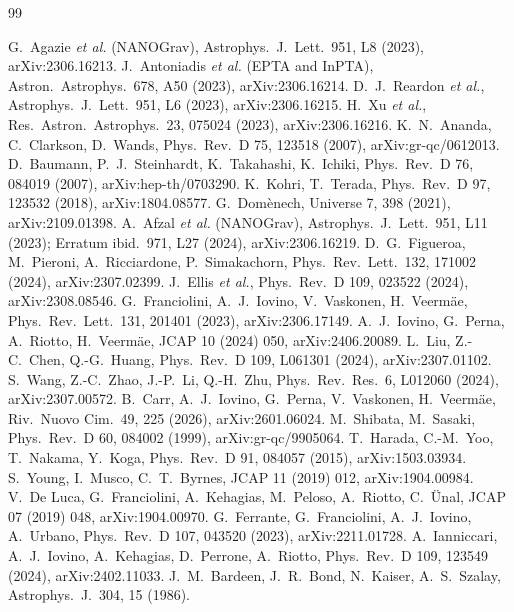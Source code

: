 \documentclass[11pt,a4paper]{article}
\begin{document}
\begin{thebibliography}{99}\raggedright
{} G.~Agazie {\it et al.} (NANOGrav), Astrophys.\ J.\ Lett.\ 951, L8 (2023), arXiv:2306.16213.
 J.~Antoniadis {\it et al.} (EPTA and InPTA), Astron.\ Astrophys.\ 678, A50 (2023), arXiv:2306.16214.
 D.~J.~Reardon {\it et al.}, Astrophys.\ J.\ Lett.\ 951, L6 (2023), arXiv:2306.16215.
 H.~Xu {\it et al.}, Res.\ Astron.\ Astrophys.\ 23, 075024 (2023), arXiv:2306.16216.
 K.~N.~Ananda, C.~Clarkson, D.~Wands, Phys.\ Rev.\ D 75, 123518 (2007), arXiv:gr-qc/0612013.
 D.~Baumann, P.~J.~Steinhardt, K.~Takahashi, K.~Ichiki, Phys.\ Rev.\ D 76, 084019 (2007), arXiv:hep-th/0703290.
 K.~Kohri, T.~Terada, Phys.\ Rev.\ D 97, 123532 (2018), arXiv:1804.08577.
 G.~Dom\`enech, Universe 7, 398 (2021), arXiv:2109.01398.
 A.~Afzal {\it et al.} (NANOGrav), Astrophys.\ J.\ Lett.\ 951, L11 (2023); Erratum ibid.\ 971, L27 (2024), arXiv:2306.16219.
 D.~G.~Figueroa, M.~Pieroni, A.~Ricciardone, P.~Simakachorn, Phys.\ Rev.\ Lett.\ 132, 171002 (2024), arXiv:2307.02399.
 J.~Ellis {\it et al.}, Phys.\ Rev.\ D 109, 023522 (2024), arXiv:2308.08546.
 G.~Franciolini, A.~J.~Iovino, V.~Vaskonen, H.~Veerm\"ae, Phys.\ Rev.\ Lett.\ 131, 201401 (2023), arXiv:2306.17149.
 A.~J.~Iovino, G.~Perna, A.~Riotto, H.~Veerm\"ae, JCAP 10 (2024) 050, arXiv:2406.20089.
 L.~Liu, Z.-C.~Chen, Q.-G.~Huang, Phys.\ Rev.\ D 109, L061301 (2024), arXiv:2307.01102.
 S.~Wang, Z.-C.~Zhao, J.-P.~Li, Q.-H.~Zhu, Phys.\ Rev.\ Res.\ 6, L012060 (2024), arXiv:2307.00572.
 B.~Carr, A.~J.~Iovino, G.~Perna, V.~Vaskonen, H.~Veerm\"ae, Riv.\ Nuovo Cim.\ 49, 225 (2026), arXiv:2601.06024.
 M.~Shibata, M.~Sasaki, Phys.\ Rev.\ D 60, 084002 (1999), arXiv:gr-qc/9905064.
 T.~Harada, C.-M.~Yoo, T.~Nakama, Y.~Koga, Phys.\ Rev.\ D 91, 084057 (2015), arXiv:1503.03934.
 S.~Young, I.~Musco, C.~T.~Byrnes, JCAP 11 (2019) 012, arXiv:1904.00984.
 V.~De Luca, G.~Franciolini, A.~Kehagias, M.~Peloso, A.~Riotto, C.~\"Unal, JCAP 07 (2019) 048, arXiv:1904.00970.
 G.~Ferrante, G.~Franciolini, A.~J.~Iovino, A.~Urbano, Phys.\ Rev.\ D 107, 043520 (2023), arXiv:2211.01728.
 A.~Ianniccari, A.~J.~Iovino, A.~Kehagias, D.~Perrone, A.~Riotto, Phys.\ Rev.\ D 109, 123549 (2024), arXiv:2402.11033.
 J.~M.~Bardeen, J.~R.~Bond, N.~Kaiser, A.~S.~Szalay, Astrophys.\ J.\ 304, 15 (1986).

\end{thebibliography}
\end{document}
